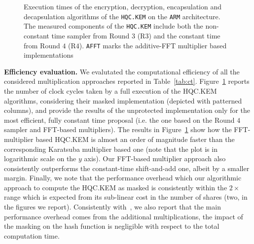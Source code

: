 \begin{figure}[!t]

\caption{Execution times of the encryption, decryption, encapsulation and 
decapsulation algorithms of the \texttt{HQC.KEM} on the \texttt{ARM} 
architecture. The measured components of the \texttt{HQC.KEM} include both the 
non-constant time sampler from Round $3$ (R$3$) and the constant time from 
Round $4$ (R$4$). \texttt{AFFT} marks the additive-FFT multiplier based implementations\label{fig:timing_hqc_kem}}
\vspace{-0.4cm}
\end{figure}
\noindent\textbf{Efficiency evaluation.} We evalutated the computational
efficiency of all the considered multiplication approaches reported in 
Table~\ref{tab:ct}. 
Figure~\ref{fig:timing_hqc_kem} reports the number of 
clock cycles taken by a full execution of the HQC.KEM algorithms, considering
their masked implementation (depicted with patterned columns), 
and provide the results of the unprotected implementation only for the most 
efficient, fully constant time proposal (i.e. the one based on the Round $4$ 
sampler and FFT-based multipliers).
The results in Figure~\ref{fig:timing_hqc_kem} show how the FFT-multiplier based
HQC.KEM is almost an order of magnitude faster than the corresponding Karatsuba
multiplier based one (note that the plot is in logarithmic scale on the $y$ axis).
Our FFT-based multiplier approach also consistently outperforms the 
constant-time shift-and-add one, albeit by a smaller margin.
Finally, we note that the performance overhead which our algorithmic approach
to compute the HQC.KEM as masked is consistently within the $2\times$ range
which is expected from its sub-linear cost in the number of shares (two, in
the figures we report).
Consistently with~\cite{DBLP:journals/iacr/HeinzKLPSS22}, we also report that
the main performance overhead comes from the additional multiplications, the 
impact of the masking on the hash function is negligible with respect to 
the total computation time.


% 




